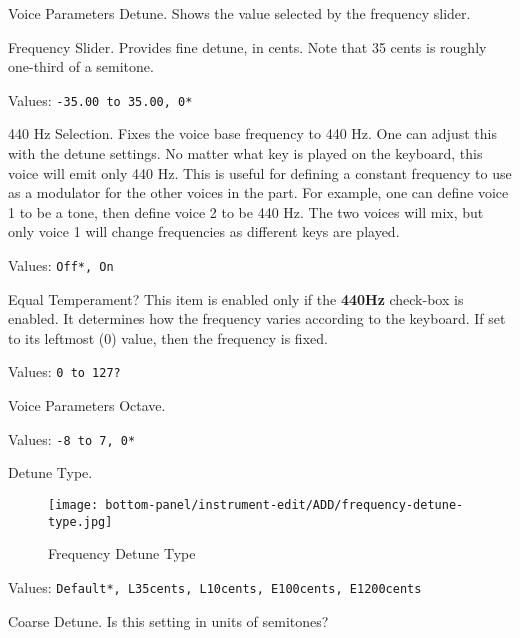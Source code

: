    \setcounter{ItemCounter}{0}      %

   Voice Parameters Detune.
   Shows the value selected by the frequency slider.

   Frequency Slider.
   Provides fine detune, in cents.
   Note that 35 cents is roughly one-third of a semitone.

   Values: \texttt{-35.00 to 35.00, 0*}

   440 Hz Selection.
   Fixes the voice base frequency to 440 Hz.
   One can adjust this with the detune settings.
   No matter what key is played on the keyboard, this voice will emit only
   440 Hz.  This is useful for defining a constant frequency to use as a
   modulator for the other voices in the part.
   For example, one can define voice 1 to be a tone, then
   define voice 2 to be 440 Hz.  The two voices will mix, but only voice 1
   will change frequencies as different keys are played.

   Values: \texttt{Off*, On}

   Equal Temperament?
   This item is enabled only if the \textbf{440Hz} check-box is enabled.
   It determines how the frequency varies according to the
   keyboard.  If set to its leftmost (0) value, then the frequency is fixed.

   Values: \texttt{0 to 127?}

   Voice Parameters Octave.

   Values: \texttt{-8 to 7, 0*}

%

   Detune Type.

\begin{figure}[H]
   \centering
   \texttt{[image: bottom-panel/instrument-edit/ADD/frequency-detune-type.jpg]}
   \caption{Frequency Detune Type}
   \label{fig:frequency_detune_tYpe}
\end{figure}

   Values: \texttt{Default*, L35cents, L10cents, E100cents, E1200cents}

   Coarse Detune.
   Is this setting in units of semitones?

